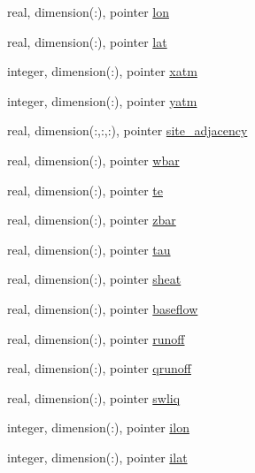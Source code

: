 \begin{DoxyCompactItemize}
\item 
real, dimension(\+:), pointer \hyperlink{structed__state__vars_1_1edtype_adf3d7b87d2e86ca60877f09d2d5a9a15}{lon}
\item 
real, dimension(\+:), pointer \hyperlink{structed__state__vars_1_1edtype_a9f58337db4e01b7d2c7e7cb16899add6}{lat}
\item 
integer, dimension(\+:), pointer \hyperlink{structed__state__vars_1_1edtype_ad6b3ec02e10edccf4c9f1a14ee73880f}{xatm}
\item 
integer, dimension(\+:), pointer \hyperlink{structed__state__vars_1_1edtype_aea7564e821ca6d859816dbf8bda88997}{yatm}
\item 
real, dimension(\+:,\+:,\+:), pointer \hyperlink{structed__state__vars_1_1edtype_a4494afd6d8121ecc594771e76756776c}{site\+\_\+adjacency}
\item 
real, dimension(\+:), pointer \hyperlink{structed__state__vars_1_1edtype_a556f553a989e9df68b67a18cd063ce13}{wbar}
\item 
real, dimension(\+:), pointer \hyperlink{structed__state__vars_1_1edtype_a4e4056d3af8745709271b1df98d70b29}{te}
\item 
real, dimension(\+:), pointer \hyperlink{structed__state__vars_1_1edtype_a257929133500f55ec04685e31ddbe474}{zbar}
\item 
real, dimension(\+:), pointer \hyperlink{structed__state__vars_1_1edtype_a731ac9a995e74ebb5fcfeb255117f36b}{tau}
\item 
real, dimension(\+:), pointer \hyperlink{structed__state__vars_1_1edtype_a0d7f4c2a258d7efd0836ba75f6bd8ef5}{sheat}
\item 
real, dimension(\+:), pointer \hyperlink{structed__state__vars_1_1edtype_ab69e0f8b375f296101396a379d260c25}{baseflow}
\item 
real, dimension(\+:), pointer \hyperlink{structed__state__vars_1_1edtype_a6950fe045bb7bde082628998055ad692}{runoff}
\item 
real, dimension(\+:), pointer \hyperlink{structed__state__vars_1_1edtype_ae80dce9b4550463e59242d8021c49252}{qrunoff}
\item 
real, dimension(\+:), pointer \hyperlink{structed__state__vars_1_1edtype_a6ebe8fb6f6bc5d4e1443dba7ed49a4f3}{swliq}
\item 
integer, dimension(\+:), pointer \hyperlink{structed__state__vars_1_1edtype_a22aa678e4fb7e2c15bd468ae05bfb54e}{ilon}
\item 
integer, dimension(\+:), pointer \hyperlink{structed__state__vars_1_1edtype_a2bcc7bde535419e42bbd3d8a6d0e37e3}{ilat}

\end{DoxyCompactItemize}
